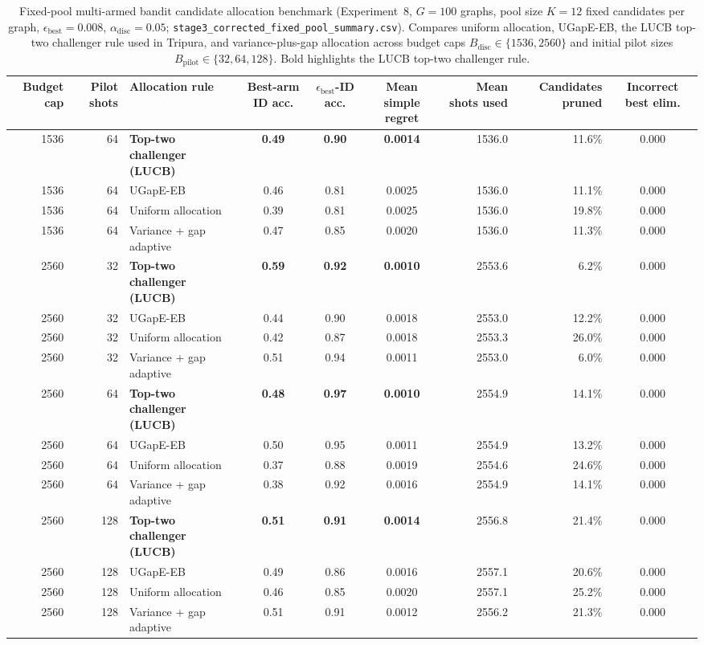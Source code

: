 \begin{table}[htbp]
\caption{Fixed-pool multi-armed bandit candidate allocation benchmark (Experiment~8, $G=100$ graphs, pool size $K=12$ fixed candidates per graph, $\epsilon_{\mathrm{best}}=0.008$, $\alpha_{\mathrm{disc}}=0.05$; \texttt{stage3\_corrected\_fixed\_pool\_summary.csv}). Compares uniform allocation, UGapE-EB, the LUCB top-two challenger rule used in Tripura, and variance-plus-gap allocation across budget caps $B_{\mathrm{disc}} \in \{1536, 2560\}$ and initial pilot sizes $B_{\mathrm{pilot}} \in \{32, 64, 128\}$. Bold highlights the LUCB top-two challenger rule.}
\label{tab:fixed_pool}
\centering
\footnotesize
\begin{tabular}{@{}r r l c c c r r c@{}}
\toprule
Budget cap & Pilot shots & Allocation rule & Best-arm ID acc. & $\epsilon_{\mathrm{best}}$-ID acc. & Mean simple regret & Mean shots used & Candidates pruned & Incorrect best elim. \\
\midrule
1536 & 64 & \textbf{Top-two challenger (LUCB)} & \textbf{0.49} & \textbf{0.90} & \textbf{0.0014} & 1536.0 & 11.6\% & 0.000 \\
1536 & 64 & UGapE-EB & 0.46 & 0.81 & 0.0025 & 1536.0 & 11.1\% & 0.000 \\
1536 & 64 & Uniform allocation & 0.39 & 0.81 & 0.0025 & 1536.0 & 19.8\% & 0.000 \\
1536 & 64 & Variance + gap adaptive & 0.47 & 0.85 & 0.0020 & 1536.0 & 11.3\% & 0.000 \\
2560 & 32 & \textbf{Top-two challenger (LUCB)} & \textbf{0.59} & \textbf{0.92} & \textbf{0.0010} & 2553.6 & 6.2\% & 0.000 \\
2560 & 32 & UGapE-EB & 0.44 & 0.90 & 0.0018 & 2553.0 & 12.2\% & 0.000 \\
2560 & 32 & Uniform allocation & 0.42 & 0.87 & 0.0018 & 2553.3 & 26.0\% & 0.000 \\
2560 & 32 & Variance + gap adaptive & 0.51 & 0.94 & 0.0011 & 2553.0 & 6.0\% & 0.000 \\
2560 & 64 & \textbf{Top-two challenger (LUCB)} & \textbf{0.48} & \textbf{0.97} & \textbf{0.0010} & 2554.9 & 14.1\% & 0.000 \\
2560 & 64 & UGapE-EB & 0.50 & 0.95 & 0.0011 & 2554.9 & 13.2\% & 0.000 \\
2560 & 64 & Uniform allocation & 0.37 & 0.88 & 0.0019 & 2554.6 & 24.6\% & 0.000 \\
2560 & 64 & Variance + gap adaptive & 0.38 & 0.92 & 0.0016 & 2554.9 & 14.1\% & 0.000 \\
2560 & 128 & \textbf{Top-two challenger (LUCB)} & \textbf{0.51} & \textbf{0.91} & \textbf{0.0014} & 2556.8 & 21.4\% & 0.000 \\
2560 & 128 & UGapE-EB & 0.49 & 0.86 & 0.0016 & 2557.1 & 20.6\% & 0.000 \\
2560 & 128 & Uniform allocation & 0.46 & 0.85 & 0.0020 & 2557.1 & 25.2\% & 0.000 \\
2560 & 128 & Variance + gap adaptive & 0.51 & 0.91 & 0.0012 & 2556.2 & 21.3\% & 0.000 \\
\bottomrule
\end{tabular}
\end{table}
